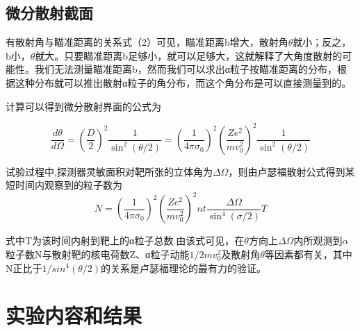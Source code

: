 \documentclass[a4paper,10.0pt,twoside]{npr}
\begin{document}
\begin{multicols}{2}
\subsection{微分散射截面}

有散射角与瞄准距离的关系式（2）可见，瞄准距离b增大，散射角$\theta$就小；反之，b小，$\theta$就大。只要瞄准距离b足够小，就可以足够大，这就解释了大角度散射的可能性。我们无法测量瞄准距离b，然而我们可以求出α粒子按瞄准距离的分布，根据这种分布就可以推出散射α粒子的角分布，而这个角分布是可以直接测量到的。

计算可以得到微分散射界面的公式为

\begin{equation}
	\frac{d \theta}{d \Omega} = (\frac{D}{2})^2 \frac{1}{\sin^2{(\theta/2)}} = (\frac{1}{4\pi\sigma_0})^2(\frac{Ze^2}{mv_0^2})^2\frac{1}{\sin^2{(\theta/2)}}
\end{equation}

试验过程中,探测器灵敏面积对靶所张的立体角为$\Delta\Omega$，则由卢瑟福散射公式得到某短时间内观察到的粒子数为
\begin{equation}
	N=(\frac{1}{4\pi\sigma_0})^2(\frac{Ze^2}{mv_0^2})^2nt\frac{\Delta\Omega}{\sin^4(\sigma/2)}T
\end{equation}

式中T为该时间内射到靶上的α粒子总数.由该式可见，在$\theta$方向上$\Delta\Omega$内所观测到$\alpha$粒子数N与散射靶的核电荷数Z、α粒子动能$1/2mv_0^2$及散射角$\theta$等因素都有关，其中N正比于$1/sin^4(\theta/2)$的关系是卢瑟福理论的最有力的验证。


\section{实验内容和结果}


\end{multicols}
\end{document}
